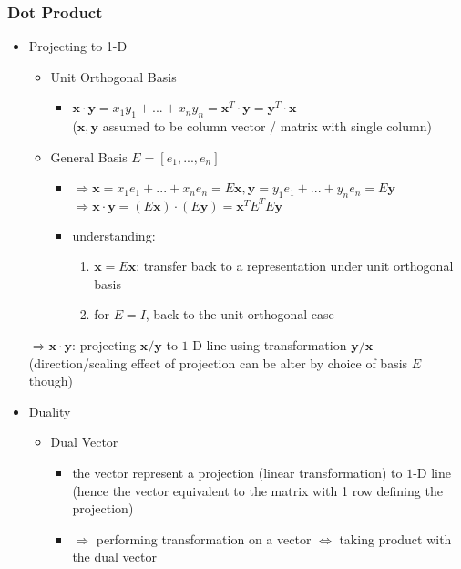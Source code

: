 \subsubsection{Dot Product}
\begin{itemize}
\item Projecting to 1-D
	\begin{itemize}
	\item Unit Orthogonal Basis
		\begin{itemize}
		\item $\mathbf x\cdot \mathbf y = x_1y_1 +...+ x_ny_n = \mathbf x^T \cdot \mathbf y = \mathbf y^T\cdot \mathbf x$ \\
		($\mathbf x,\mathbf y$ assumed to be column vector / matrix with single column)
		\end{itemize}
	\item General Basis $E=[e_1,...,e_n]$
		\begin{itemize}
		\item $\Rightarrow \mathbf x = x_1e_1+...+x_ne_n=E\mathbf x, \mathbf y = y_1e_1+...+y_ne_n = E \mathbf y$ \\
		$\Rightarrow \mathbf x\cdot \mathbf y = (E\mathbf x) \cdot (E \mathbf y) = \mathbf x^TE^TE\mathbf y$
		\item understanding: 
			\begin{enumerate}
			\item $\mathbf x = E\mathbf x$: transfer back to a representation under unit orthogonal basis
			\item for $E=I$, back to the unit orthogonal case
			\end{enumerate}
		\end{itemize}
	\end{itemize}
$\Rightarrow \mathbf x\cdot \mathbf y$: projecting $\mathbf x/\mathbf y$ to $1$-D line using transformation $\mathbf y/\mathbf x$ \\ 
(direction/scaling effect of projection can be alter by choice of basis $E$ though)
\item Duality
	\begin{itemize}
	\item Dual Vector
		\begin{itemize}
		\item the vector represent a projection (linear transformation) to $1$-D line \\
		(hence the vector equivalent to the matrix with 1 row defining the projection)
		\item $\Rightarrow$ performing transformation on a vector $\Leftrightarrow$ taking product with the dual vector
		\end{itemize}
	\end{itemize}
\end{itemize}

